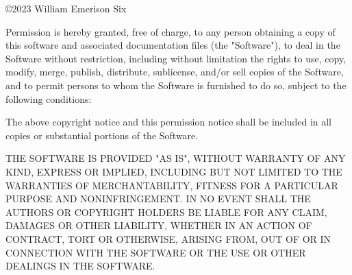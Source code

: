 \documentclass[12pt]{article}
\begin{document}
\copyright 2023 William Emerison Six

Permission is hereby granted, free of charge, to any person obtaining a copy of this software and associated documentation files (the "Software"), to deal in the Software without restriction, including without limitation the rights to use, copy, modify, merge, publish, distribute, sublicense, and/or sell copies of the Software, and to permit persons to whom the Software is furnished to do so, subject to the following conditions:

The above copyright notice and this permission notice shall be included in all copies or substantial portions of the Software.

THE SOFTWARE IS PROVIDED "AS IS", WITHOUT WARRANTY OF ANY KIND, EXPRESS OR IMPLIED, INCLUDING BUT NOT LIMITED TO THE WARRANTIES OF MERCHANTABILITY, FITNESS FOR A PARTICULAR PURPOSE AND NONINFRINGEMENT. IN NO EVENT SHALL THE AUTHORS OR COPYRIGHT HOLDERS BE LIABLE FOR ANY CLAIM, DAMAGES OR OTHER LIABILITY, WHETHER IN AN ACTION OF CONTRACT, TORT OR OTHERWISE, ARISING FROM, OUT OF OR IN CONNECTION WITH THE SOFTWARE OR THE USE OR OTHER DEALINGS IN THE SOFTWARE.
\end{document}
